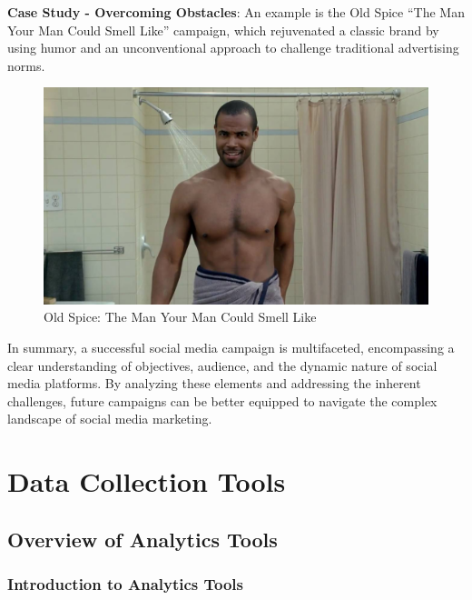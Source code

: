 \documentclass[
]{book}
\begin{document}
\textbf{Case Study - Overcoming Obstacles}: An example is the Old Spice ``The Man Your Man Could Smell Like'' campaign, which rejuvenated a classic brand by using humor and an unconventional approach to challenge traditional advertising norms.

\begin{figure}
\centering
\includegraphics[width=1\textwidth,height=\textheight]{images/oldspice.jpg}
\caption{Old Spice: The Man Your Man Could Smell Like}
\end{figure}

In summary, a successful social media campaign is multifaceted, encompassing a clear understanding of objectives, audience, and the dynamic nature of social media platforms. By analyzing these elements and addressing the inherent challenges, future campaigns can be better equipped to navigate the complex landscape of social media marketing.

\hypertarget{data-collection-tools}{%
\chapter{Data Collection Tools}\label{data-collection-tools}}

\hypertarget{overview-of-analytics-tools}{%
\section*{Overview of Analytics Tools}\label{overview-of-analytics-tools}}

\hypertarget{introduction-to-analytics-tools}{%
\subsection*{Introduction to Analytics Tools}\label{introduction-to-analytics-tools}}
\end{document}
